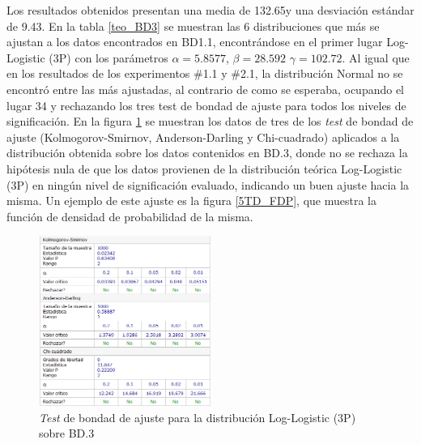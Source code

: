 \documentclass[12pt]{report}
\begin{document}
Los resultados obtenidos presentan una media de 132.65\degree y una desviación estándar de 9.43\degree. En la tabla \ref{teo_BD3}  se muestran las 6 distribuciones que más se ajustan a los datos encontrados en BD1.1, encontrándose en el primer lugar Log-Logistic (3P) con los parámetros $\alpha=5.8577$, $\beta=28.592$ $\gamma=102.72$. Al igual que en los resultados de los experimentos \#1.1 y \#2.1, la distribución Normal no se encontró entre las más ajustadas, al contrario de como se esperaba, ocupando el lugar 34 y rechazando los tres test de bondad de ajuste para todos los niveles de significación. En la figura \ref{5TD_BONDAD} se  muestran los datos de tres de los \textit{test} de bondad de ajuste (Kolmogorov-Smirnov, Anderson-Darling y Chi-cuadrado) aplicados a la distribución obtenida sobre los datos contenidos en BD.3, donde no se rechaza la hipótesis nula de que los datos provienen de la distribución teórica Log-Logistic (3P) en ningún nivel de significación evaluado, indicando un buen ajuste hacia la misma. Un ejemplo de este ajuste es la figura \ref{5TD_FDP}, que muestra la función de densidad de probabilidad de la misma. 
\begin{figure}[ht]
	\centering
	
	\includegraphics[width=0.5\textwidth]{5td_bondad.png}
	\caption{\textit{Test} de bondad de ajuste para la distribución Log-Logistic (3P) sobre BD.3}
	\label{5TD_BONDAD}
\end{figure}
         
\end{document}
